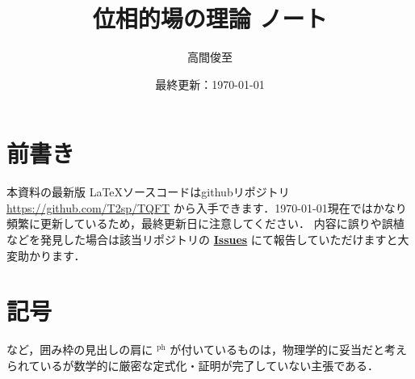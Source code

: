 \documentclass{ltjsreport}
\theoremstyle{mystyle} %
\numberwithin{equation}{section}
\begin{document}
\title{位相的場の理論 ノート}
\author{高間俊至}
\date{最終更新：\today}
\maketitle

\section*{前書き}


本資料の最新版 \LaTeX ソースコードはgithubリポジトリ \url{https://github.com/T2sp/TQFT} から入手できます．\today 現在ではかなり頻繁に更新しているため，最終更新日に注意してください．
内容に誤りや誤植などを発見した場合は該当リポジトリの \href{https://github.com/T2sp/TQFT/issues}{\textbf{\textsf{Issues}}} にて報告していただけますと大変助かります．

\section*{記号}

\begin{mydefph}[]{}
    
\end{mydefph}

\begin{myconjph}[]{}
    
\end{myconjph}

\begin{mypropph}[]{}
    
\end{mypropph}

など，囲み枠の見出しの肩に ${}^{\text{ph}}$ が付いているものは，物理学的に妥当だと考えられているが数学的に厳密な定式化・証明が完了していない主張である．

\setcounter{tocdepth}{2}
\tableofcontents









% 
\end{document}
